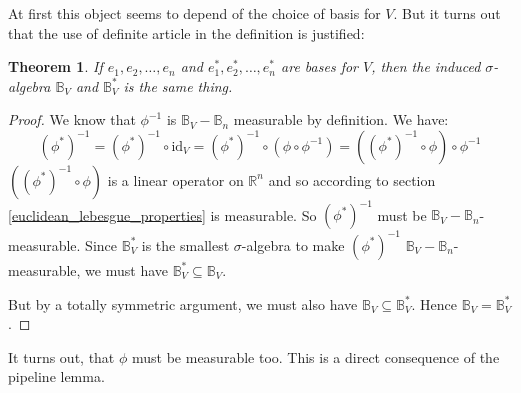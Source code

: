 \documentclass[12pt, a4paper]{article}
\newtheorem{theorem}{Theorem}[section]
\numberwithin{equation}{section}
\begin{document}
At first this object seems to depend of the choice of basis for $V$. But it turns out that the use of definite article in the definition is justified:
\begin{theorem}
If $e_1,e_2,\ldots,e_n$ and $e^*_1,e^*_2,\ldots,e^*_n$ are bases for $V$, then the induced $\sigma$-algebra $\mathbb{B}_V$ and $\mathbb{B}^*_V$ is the same thing.
\end{theorem}
\begin{proof}
We know that $\phi^{-1}$ is $\mathbb{B}_V-\mathbb{B}_n$ measurable by definition. We have:
\begin{equation}
(\phi^*)^{-1}=(\phi^*)^{-1}\circ\textrm{id}_V=(\phi^*)^{-1}\circ(\phi\circ\phi^{-1})=\left((\phi^*)^{-1}\circ\phi\right)\circ\phi^{-1}
\end{equation}
$\left((\phi^*)^{-1}\circ\phi\right)$ is a linear operator on $\mathbb{R}^n$ and so according to section \ref{euclidean_lebesgue_properties} is measurable. So $(\phi^*)^{-1}$ must be $\mathbb{B}_V-\mathbb{B}_n$-measurable. Since $\mathbb{B}_V^*$ is the smallest $\sigma$-algebra to make $(\phi^*)^{-1}$ $\mathbb{B}_V-\mathbb{B}_n$-measurable, we must have $\mathbb{B}^*_V\subseteq\mathbb{B}_V$.

But by a totally symmetric argument, we must also have $\mathbb{B}_V\subseteq\mathbb{B}^*_V$. Hence $\mathbb{B}_V=\mathbb{B}^*_V$.
\end{proof}

It turns out, that $\phi$ must be measurable too. This is a direct consequence of the pipeline lemma.
\end{document}

